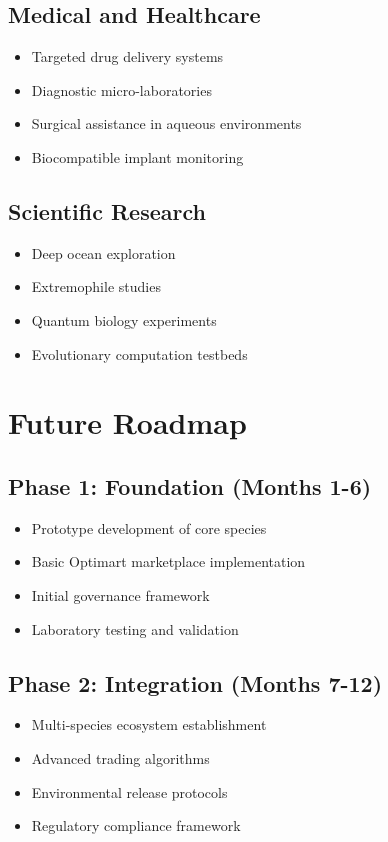 \documentclass[11pt,a4paper]{article}
\begin{document}
\subsection{Medical and Healthcare}
\begin{itemize}
    \item Targeted drug delivery systems
    \item Diagnostic micro-laboratories
    \item Surgical assistance in aqueous environments
    \item Biocompatible implant monitoring
\end{itemize}

\subsection{Scientific Research}
\begin{itemize}
    \item Deep ocean exploration
    \item Extremophile studies
    \item Quantum biology experiments
    \item Evolutionary computation testbeds
\end{itemize}

\section{Future Roadmap}
\label{sec:roadmap}

\subsection{Phase 1: Foundation (Months 1-6)}
\begin{itemize}
    \item Prototype development of core species
    \item Basic Optimart marketplace implementation
    \item Initial governance framework
    \item Laboratory testing and validation
\end{itemize}

\subsection{Phase 2: Integration (Months 7-12)}
\begin{itemize}
    \item Multi-species ecosystem establishment
    \item Advanced trading algorithms
    \item Environmental release protocols
    \item Regulatory compliance framework
\end{itemize}
\end{document}
